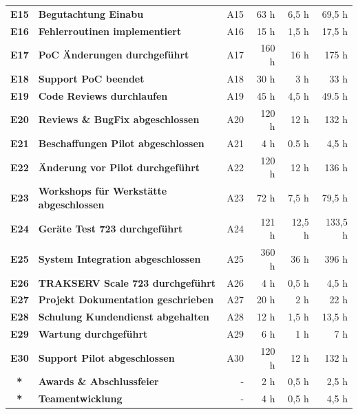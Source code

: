 \documentclass[a4paper,10pt]{scrartcl}
\begin{document}
\begin{adjustbox}{width=\textwidth}
\begin{tabular}{clrrrr}
\textbf{E15} &\textbf{Begutachtung Einabu} 		&A15			& 63 h & 6,5 h& 69,5 h\\
\textbf{E16} &\textbf{Fehlerroutinen implementiert} 				&A16		& 15 h & 1,5 h& 17,5 h\\
\textbf{E17} &\textbf{PoC Änderungen durchgeführt} 				&A17	& 160 h & 16 h& 175 h\\
\textbf{E18} &\textbf{Support PoC beendet} 				&A18			& 30 h & 3 h& 33 h\\
\textbf{E19} &\textbf{Code Reviews durchlaufen} 				&A19			& 45 h & 4,5 h& 49.5 h\\
\textbf{E20} &\textbf{Reviews \& BugFix abgeschlossen} 			&A20		& 120 h & 12 h& 132 h\\
\textbf{E21} &\textbf{Beschaffungen Pilot abgeschlossen} 		&A21		& 4 h & 0.5 h& 4,5 h\\
\textbf{E22} &\textbf{Änderung vor Pilot durchgeführt} 			&A22		& 120 h & 12 h& 136 h\\ %
\textbf{E23} &\textbf{Workshops für Werkstätte abgeschlossen} 	&A23		& 72 h & 7,5 h& 79,5 h\\%
\textbf{E24} &\textbf{Geräte Test 723 durchgeführt}		&A24 		& 121 h & 12,5 h& 133,5 h\\ %
\textbf{E25} &\textbf{System Integration abgeschlossen} 		&A25		& 360 h & 36 h& 396 h\\	%
\textbf{E26} &\textbf{TRAKSERV Scale 723 durchgeführt} 			&A26		& 4  h & 0,5 h& 4,5 h\\
\textbf{E27} &\textbf{Projekt Dokumentation geschrieben} 		&A27		& 20 h & 2 h& 22 h\\	%
\textbf{E28} &\textbf{Schulung Kundendienst abgehalten} 	&A28			& 12 h & 1,5 h& 13,5 h\\	%
\textbf{E29} &\textbf{Wartung durchgeführt} 					&A29			& 6 h & 1 h& 7 h\\
\textbf{E30} &\textbf{Support Pilot abgeschlossen} 			&A30			& 120 h & 12 h& 132 h\\ %
\textbf{*} &\textbf{Awards \& Abschlussfeier} 	&-			& 2  h & 0,5 h& 2,5 h\\
\textbf{*} &\textbf{Teamentwicklung} 			&-			& 4 h & 0,5 h& 4,5 h\\
\bottomrule
\end{tabular}
\end{adjustbox}
\begin{acronym}[Bash]
\end{acronym}
\end{document}
